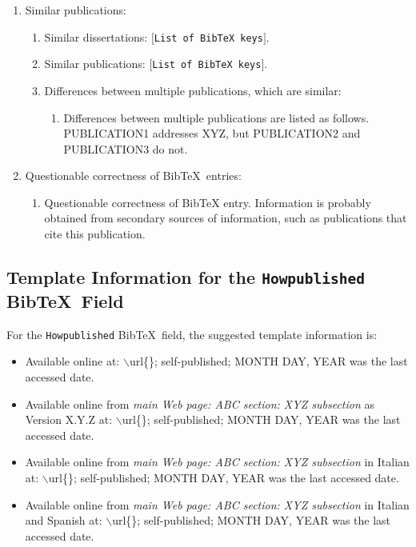 \documentclass[letter,12pt]{article}
\begin{document}
\begin{enumerate}
\begin{enumerate}
	\end{enumerate}
\item Similar publications: \vspace{-0.3cm}
	\begin{enumerate} \itemsep -2pt
	\item Similar dissertations: $[${\tt List of {\rm {\sc Bib}\TeX}\ keys}$]$.
	\item Similar publications: $[${\tt List of {\rm {\sc Bib}\TeX}\ keys}$]$.
	\item Differences between multiple publications, which are similar: \vspace{-0.2cm}
		\begin{enumerate} \itemsep -2pt
		\item Differences between multiple publications are listed as follows. PUBLICATION1 addresses XYZ, but PUBLICATION2 and PUBLICATION3 do not.
		\end{enumerate}
	\end{enumerate}
\item Questionable correctness of {\sc Bib}\TeX\ entries: \vspace{-0.3cm}
	\begin{enumerate} \itemsep -2pt
	\item Questionable correctness of BibTeX entry. Information is probably obtained from secondary sources of information, such as publications that cite this publication.
	\end{enumerate}
\end{enumerate}











\subsection{Template Information for the {\tt Howpublished} {\sc Bib}\TeX\ Field}
\label{ssec:TemplateInformationForTheHowpublishedBibTeXField}

For the {\tt Howpublished} {\sc Bib}\TeX\ field, the suggested template information is: \vspace{-0.3cm}
\begin{itemize} \itemsep -4pt
\item Available online at: $\backslash$url\{\}; self-published; MONTH DAY, YEAR was the last accessed date.
\item Available online from {\it main Web page: ABC section: XYZ subsection} as Version X.Y.Z at: $\backslash$url\{\}; self-published; MONTH DAY, YEAR was the last accessed date.
\item Available online from {\it main Web page: ABC section: XYZ subsection} in Italian at: $\backslash$url\{\}; self-published; MONTH DAY, YEAR was the last accessed date.
\item Available online from {\it main Web page: ABC section: XYZ subsection} in Italian and Spanish at: $\backslash$url\{\}; self-published; MONTH DAY, YEAR was the last accessed date.
\end{itemize}
\end{document}
